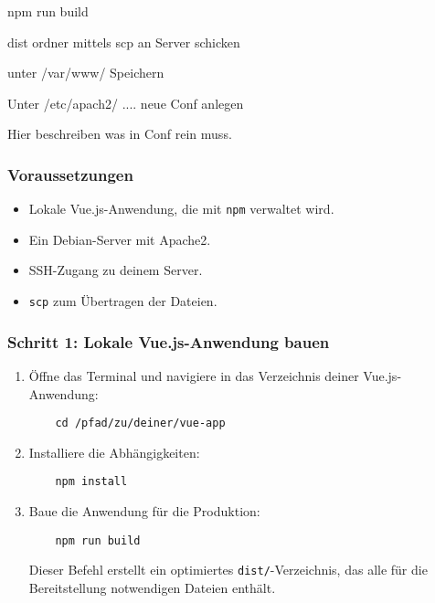 \documentclass[a4paper,12pt]{article}
\begin{document}
npm run build 

dist ordner mittels scp an Server schicken 

unter /var/www/ Speichern 

Unter /etc/apach2/ .... neue Conf anlegen

Hier beschreiben was in Conf rein muss. 


\subsubsection{Voraussetzungen}
\begin{itemize}
    \item Lokale Vue.js-Anwendung, die mit \texttt{npm} verwaltet wird.
    \item Ein Debian-Server mit Apache2.
    \item SSH-Zugang zu deinem Server.
    \item \texttt{scp} zum Übertragen der Dateien.
\end{itemize}

\subsubsection{Schritt 1: Lokale Vue.js-Anwendung bauen}
\begin{enumerate}
    \item Öffne das Terminal und navigiere in das Verzeichnis deiner Vue.js-Anwendung:
    
    \begin{lstlisting}
    cd /pfad/zu/deiner/vue-app
    \end{lstlisting}
    
    \item Installiere die Abhängigkeiten:

    \begin{lstlisting}
    npm install
    \end{lstlisting}
    
    \item Baue die Anwendung für die Produktion:

    \begin{lstlisting}
    npm run build
    \end{lstlisting}
    
    Dieser Befehl erstellt ein optimiertes \texttt{dist/}-Verzeichnis, das alle für die Bereitstellung notwendigen Dateien enthält.
\end{enumerate}
\end{document}

